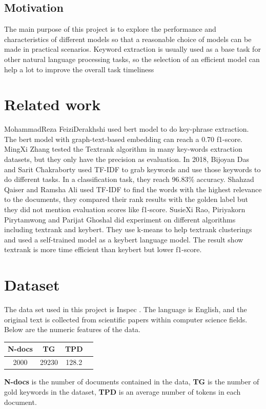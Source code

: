 \documentclass[11pt]{article}
\begin{document}
\subsection{Motivation}
The main purpose of this project is to explore the performance and characteristics of different models so that a reasonable choice of models can be made in practical scenarios. Keyword extraction is usually used as a base task for other natural language processing tasks, so the selection of an efficient model can help a lot to improve the overall task timeliness
\section{Related work}

Mohammad\text{-}Reza Feizi\text{-}Derakhshi\cite{bmo} used bert model to do key-phrase extraction. The bert model with graph-text-based embedding can reach a 0.70 f1-score. 
MingXi Zhang\cite{article33} tested the Textrank algorithm in many key-words extraction datasets, but they only have the precision as evaluation.
In 2018, Bijoyan Das and Sarit Chakraborty\cite{DBLP} used TF-IDF to grab keywords and use those keywords to do different tasks. In a classification task, they reach 96.83$\%$
accuracy. Shahzad Qaiser and Ramsha Ali \cite{234}used TF-IDF to find the words with the highest
relevance to the documents, they compared their rank results with the golden label but they did not mention evaluation scores like f1-score. SusieXi Rao, Piriyakorn Pirytamwong and Parijat Ghoshal \cite{rao} did experiment on different algorithms including textrank and keybert. They use k-means to help textrank clusterings and used a self-trained model as a keybert language model. The result show textrank is more time efficient than keybert but lower f1-score.

\section{Dataset}
The data set used in this project is Inspec \cite{inspec}. The language is English, and the original text is collected from scientific papers within computer
science fields. Below are the numeric features of the data.

\begin{center}
  \begin{tabular}{cccc}
      \hline
      N-docs& TG & TPD\\
      \hline
      2000&29230& 128.2\\
      
      \hline
      \end{tabular}
  \end{center}
  \noindent
  \textbf{N-docs} is the number of documents contained in the data, \textbf{TG} is the number
  of gold keywords in the dataset, \textbf{TPD} is an average number of tokens in each document.
\end{document}
